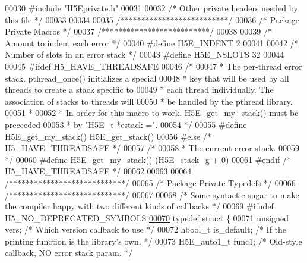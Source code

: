 \begin{DoxyCode}
00030 \textcolor{preprocessor}{#include "H5Eprivate.h"}
00031 
00032 \textcolor{comment}{/* Other private headers needed by this file */}
00033 
00034 
00035 \textcolor{comment}{/**************************/}
00036 \textcolor{comment}{/* Package Private Macros */}
00037 \textcolor{comment}{/**************************/}
00038 
00039 \textcolor{comment}{/* Amount to indent each error */}
00040 \textcolor{preprocessor}{#define H5E\_INDENT              2}
00041 
00042 \textcolor{comment}{/* Number of slots in an error stack */}
00043 \textcolor{preprocessor}{#define H5E\_NSLOTS          32}
00044 
00045 \textcolor{preprocessor}{#ifdef H5\_HAVE\_THREADSAFE}
00046 \textcolor{comment}{/*}
00047 \textcolor{comment}{ * The per-thread error stack. pthread\_once() initializes a special}
00048 \textcolor{comment}{ * key that will be used by all threads to create a stack specific to}
00049 \textcolor{comment}{ * each thread individually. The association of stacks to threads will}
00050 \textcolor{comment}{ * be handled by the pthread library.}
00051 \textcolor{comment}{ *}
00052 \textcolor{comment}{ * In order for this macro to work, H5E\_get\_my\_stack() must be preceeded}
00053 \textcolor{comment}{ * by "H5E\_t *estack =".}
00054 \textcolor{comment}{ */}
00055 \textcolor{preprocessor}{#define H5E\_get\_my\_stack()  H5E\_get\_stack()}
00056 \textcolor{preprocessor}{#else }\textcolor{comment}{/* H5\_HAVE\_THREADSAFE */}\textcolor{preprocessor}{}
00057 \textcolor{comment}{/*}
00058 \textcolor{comment}{ * The current error stack.}
00059 \textcolor{comment}{ */}
00060 \textcolor{preprocessor}{#define H5E\_get\_my\_stack() (H5E\_stack\_g + 0)}
00061 \textcolor{preprocessor}{#endif }\textcolor{comment}{/* H5\_HAVE\_THREADSAFE */}\textcolor{preprocessor}{}
00062 
00063 
00064 \textcolor{comment}{/****************************/}
00065 \textcolor{comment}{/* Package Private Typedefs */}
00066 \textcolor{comment}{/****************************/}
00067 
00068 \textcolor{comment}{/* Some syntactic sugar to make the compiler happy with two different kinds of callbacks */}
00069 \textcolor{preprocessor}{#ifndef H5\_NO\_DEPRECATED\_SYMBOLS}
\hyperlink{struct_h5_e__auto__op__t}{00070} \textcolor{keyword}{typedef} \textcolor{keyword}{struct }\{
00071     \textcolor{keywordtype}{unsigned}    vers;       \textcolor{comment}{/* Which version callback to use */}
00072     hbool\_t     is\_default; \textcolor{comment}{/* If the printing function is the library's own. */}
00073     H5E\_auto1\_t func1;      \textcolor{comment}{/* Old-style callback, NO error stack param. */}

\end{DoxyCode}
